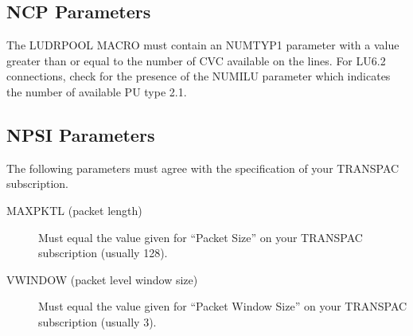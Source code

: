 \documentclass[letterpaper,10pt,english]{sphinxmanual}
\begin{document}
\ignorespaces 

\subsection{NCP Parameters}
\label{\detokenize{connectivity_guide:ncp-parameters}}\label{\detokenize{connectivity_guide:index-65}}
The LUDRPOOL MACRO must contain an NUMTYP1 parameter with a value greater than or equal to the number of CVC available on the lines. For LU6.2 connections, check for the presence of the NUMILU parameter which indicates the number of available PU type 2.1.

\ignorespaces 

\subsection{NPSI Parameters}
\label{\detokenize{connectivity_guide:npsi-parameters}}\label{\detokenize{connectivity_guide:index-66}}
The following parameters must agree with the specification of your TRANSPAC subscription.

\begin{description}
\item[{MAXPKTL (packet length)}] \leavevmode
Must equal the value given for “Packet Size” on your TRANSPAC subscription (usually 128).

\item[{VWINDOW (packet level window size)}] \leavevmode
Must equal the value given for “Packet Window Size” on your TRANSPAC subscription (usually 3).

\end{description}
\end{document}
